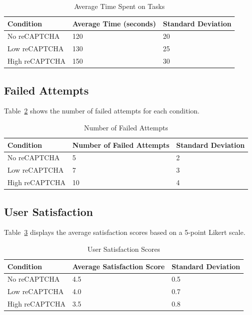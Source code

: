 \documentclass{article}
\begin{document}
\begin{table}[ht]
\centering
\caption{Average Time Spent on Tasks}
\label{tab:time_spent}
\begin{tabular}{@{}lll@{}}
\toprule
Condition & Average Time (seconds) & Standard Deviation \\ \midrule
No reCAPTCHA & 120 & 20 \\
Low reCAPTCHA & 130 & 25 \\
High reCAPTCHA & 150 & 30 \\ \bottomrule
\end{tabular}
\end{table}

\subsection{Failed Attempts}
Table~\ref{tab:failed_attempts} shows the number of failed attempts for each condition.

\begin{table}[ht]
\centering
\caption{Number of Failed Attempts}
\label{tab:failed_attempts}
\begin{tabular}{@{}lll@{}}
\toprule
Condition & Number of Failed Attempts & Standard Deviation \\ \midrule
No reCAPTCHA & 5 & 2 \\
Low reCAPTCHA & 7 & 3 \\
High reCAPTCHA & 10 & 4 \\ \bottomrule
\end{tabular}
\end{table}

\subsection{User Satisfaction}
Table~\ref{tab:satisfaction} displays the average satisfaction scores based on a 5-point Likert scale.

\begin{table}[ht]
\centering
\caption{User Satisfaction Scores}
\label{tab:satisfaction}
\begin{tabular}{@{}lll@{}}
\toprule
Condition & Average Satisfaction Score & Standard Deviation \\ \midrule
No reCAPTCHA & 4.5 & 0.5 \\
Low reCAPTCHA & 4.0 & 0.7 \\
High reCAPTCHA & 3.5 & 0.8 \\ \bottomrule
\end{tabular}
\end{table}
\end{document}
